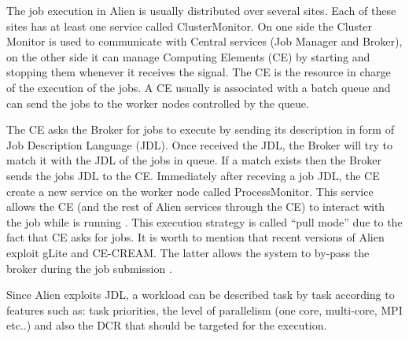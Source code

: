 
The job execution in Alien is usually distributed over several sites. Each of these sites has at least one service called ClusterMonitor. On one side the Cluster Monitor is used to communicate with Central services (Job Manager and Broker), on the other side it can manage Computing Elements (CE) by starting and stopping them whenever it receives the signal.
The CE is the resource in charge of the execution of the jobs. A CE usually is associated with a batch queue and can send the jobs to the worker nodes controlled by the queue.

The CE asks the Broker for jobs to execute by sending its description in form of Job Description Language (JDL).
Once received the JDL, the Broker will try to match it with the JDL of the jobs in queue. If a match exists then the Broker sends the jobs JDL to the CE.
Immediately after receving a job JDL, the CE create a new service on the worker node called ProcessMonitor. This service allows the CE (and the rest of Alien services through the CE) to interact with the job while is running \cite{Saiz2003}. 
This execution strategy is called ``pull mode'' due to the fact that CE asks for jobs.
It is worth to mention that recent versions of Alien exploit gLite and CE-CREAM. The latter allows the system to by-pass the broker during the job submission \cite{Bagnasco2004}. 

Since Alien exploits JDL, a  workload can be described task by task according to features such as: task priorities, the level of parallelism (one core, multi-core, MPI etc..) and  also the DCR that should be targeted for the execution.


